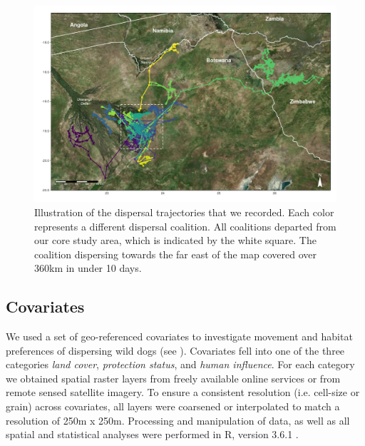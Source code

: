 \documentclass[abstract=on,10pt,a4paper,bibliography=totocnumbered]{scrartcl}
\begin{document}
\begin{figure}[h]
  \begin{center}
    \includegraphics[width = \textwidth]{99_Trajectories.pdf}
    \caption{Illustration of the dispersal trajectories that we recorded. Each
    color represents a different dispersal coalition. All coalitions departed
    from our core study area, which is indicated by the white square. The
    coalition dispersing towards the far east of the map covered over 360km in
    under 10 days.}
    \label{Trajectories}
  \end{center}
\end{figure}

\subsection{Covariates}
We used a set of geo-referenced covariates to investigate movement and habitat
preferences of dispersing wild dogs (see ). Covariates fell
into one of the three categories \textit{land cover}, \textit{protection
status}, and \textit{human influence}. For each category we obtained spatial
raster layers from freely available online services or from remote sensed
satellite imagery. To ensure a consistent resolution (i.e. cell-size or grain)
across covariates, all layers were coarsened or interpolated to match a
resolution of 250m x 250m. Processing and manipulation of data, as well as all
spatial and statistical analyses were performed in R, version 3.6.1
\citep{R.2019}.
\end{document}
